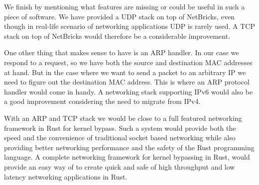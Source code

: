 We finish by mentioning what features are missing or could be useful
in such a piece of software. We have provided a UDP stack on top of
NetBricks, even though in real-life scenario of networking
applications UDP is rarely used. A TCP stack on top of NetBricks would
therefore be a considerable improvement.

One other thing that makes sense to have is an ARP handler. In our
case we respond to a request, so we have both the source and
destination MAC addresses at hand. But in the case where we want to
send a packet to an arbitrary IP we need to figure out the destination
MAC address. This is where an ARP protocol handler would come in
handy. A networking stack supporting IPv6 would also be a good
improvement considering the need to migrate from IPv4.

With an ARP and TCP stack we would be close to a full featured
networking framework in Rust for kernel bypass. Such a system would
provide both the speed and the convenience of traditional socket based
networking while also providing better networking performance and the
safety of the Rust programming language. A complete networking
framework for kernel bypassing in Rust, would provide an easy way of
to create quick and safe of high throughput and low latency
networking applications in Rust.

